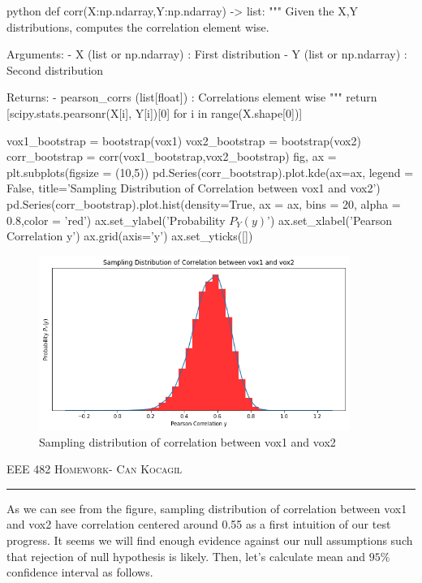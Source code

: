 \documentclass[12pt]{amsart}
\begin{document}
\begin{mintedbox}{python}
def corr(X:np.ndarray,Y:np.ndarray) -> list:
    """
        Given the X,Y distributions, computes the correlation element wise.
    
            Arguments:
                - X (list or np.ndarray) : First distribution
                - Y (list or np.ndarray) : Second distribution

            Returns:
                - pearson_corrs (list[float]) : Correlations element wise
    """
    return [scipy.stats.pearsonr(X[i], Y[i])[0] for i in range(X.shape[0])]
    
vox1_bootstrap = bootstrap(vox1)
vox2_bootstrap = bootstrap(vox2)
corr_bootstrap = corr(vox1_bootstrap,vox2_bootstrap)
fig, ax = plt.subplots(figsize = (10,5))
pd.Series(corr_bootstrap).plot.kde(ax=ax, legend = False, title='Sampling Distribution of Correlation between vox1 and vox2')
pd.Series(corr_bootstrap).plot.hist(density=True, ax = ax, bins = 20, alpha = 0.8,color = 'red')
ax.set_ylabel('Probability $P_Y(y)$')
ax.set_xlabel('Pearson Correlation y')
ax.grid(axis='y')
ax.set_yticks([])
\end{mintedbox}

\begin{figure}[h]
    \centering
    \includegraphics[width = 0.9\textwidth]{images/8.png}
    \caption{Sampling distribution of correlation between vox1 and vox2}
\end{figure}



\newpage
{\scshape EEE 482} \hfill {\scshape \large  Homework-\relax} \hfill {\scshape Can Kocagil}
\smallskip
\hrule
\vspace{2mm}

As we can see from the figure, sampling distribution of correlation between vox1 and vox2 have correlation centered around 0.55 as a first intuition of our test progress. It seems we will find enough evidence against our null assumptions such that rejection of null hypothesis is likely. Then, let's calculate mean and $95\%$ confidence interval as follows.
\end{document}
